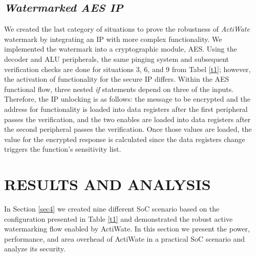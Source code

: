 \documentclass[onecolumn]{IEEEtran}
\begin{document}
\subsection{\textit{Watermarked AES IP}}
\label{sec4c}
We created the last category of situations to prove the robustness
of \textit{ActiWate} watermark by integrating an IP with more complex
functionality. We implemented the watermark into a cryptographic
module, AES. Using the decoder and ALU peripherals, the same
pinging system and subsequent verification checks are done for
situations 3, 6, and 9 from Tabel \ref{t1}; however, the activation of
functionality for the secure IP differs. Within the AES functional flow,
three nested \textit{if} statements depend on three of the inputs. Therefore,
the IP unlocking is as follows: the message to be encrypted and the
address for functionality is loaded into data registers after the first
peripheral passes the verification, and the two enables are loaded
into data registers after the second peripheral passes the verification.
Once those values are loaded, the value for the encrypted response
is calculated since the data registers change triggers the function’s
sensitivity list.

\section{RESULTS AND ANALYSIS}
\label{sec5}
 In Section \ref{sec4} we created nine different SoC scenario based on the
configuration presented in Table \ref{t1} and demonstrated the robust active
watermarking flow enabled by ActiWate. In this section we present
the power, performance, and area overhead of ActiWate in a practical
SoC scenario and analyze its security.
\end{document}
